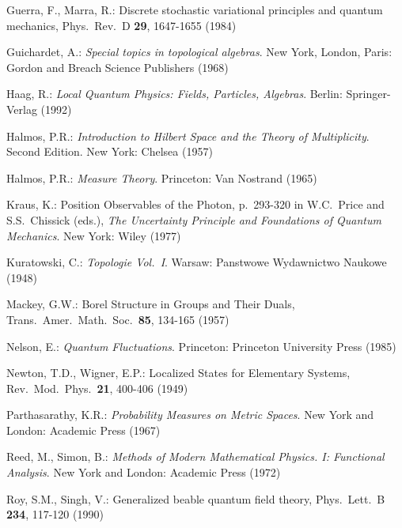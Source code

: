 \documentclass[12pt]{article}
\newcommand{\1}{\mathbf{1}} %
\begin{document}
\begin{thebibliography}{28.}
 Guerra, F., Marra, R.: Discrete stochastic
   variational principles and quantum mechanics, Phys.~Rev.~D
   \textbf{29}, 1647-1655 (1984)

 Guichardet, A.: \textit{Special topics in
   topological algebras}.  New York, London, Paris: Gordon and Breach
   Science Publishers (1968)

 Haag, R.: \textit{Local Quantum Physics: Fields,
   Particles, Algebras}.  Berlin: Springer-Verlag (1992)

 Halmos, P.R.: \textit{Introduction to Hilbert Space
   and the Theory of Multiplicity}. Second Edition. New York: Chelsea
   (1957)

 Halmos, P.R.: \textit{Measure Theory}. Princeton:
   Van Nostrand (1965)


 Kraus, K.: Position Observables of the Photon,
   p.~293-320 in W.C.~Price and S.S.~Chissick (eds.), \textit{The
   Uncertainty Principle and Foundations of Quantum Mechanics}. New
   York: Wiley (1977)

 Kuratowski, C.: \textit{Topologie Vol.\
   I}. Warsaw: Panstwowe Wydawnictwo Naukowe (1948)

 Mackey, G.W.: Borel Structure in Groups and Their
   Duals, Trans.\ Amer.\ Math.\ Soc.\ \textbf{85}, 134-165 (1957)

 Nelson, E.: \textit{Quantum Fluctuations}.
   Princeton: Princeton University Press (1985)

 Newton, T.D., Wigner, E.P.: Localized States
   for Elementary Systems, Rev.\ Mod.\ Phys.\ \textbf{21}, 400-406
   (1949)


 Parthasarathy, K.R.: \textit{Probability Measures on
   Metric Spaces}. New York and London: Academic Press (1967)

 Reed, M., Simon, B.: \textit{Methods of Modern
   Mathematical Physics. I: Functional Analysis}. New York and London:
   Academic Press (1972)

 Roy, S.M., Singh, V.: Generalized beable quantum
   field theory, Phys.\ Lett.\ B \textbf{234}, 117-120 (1990)


\end{thebibliography}
\end{document}
